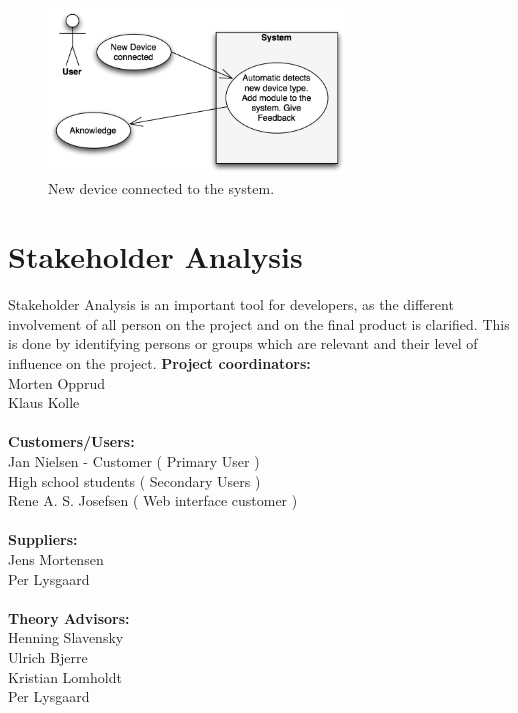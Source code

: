\begin{figure}[H]
	\begin{centering}
		\includegraphics[width=0.7\textwidth]{images/usecases2.jpg}
		\caption{New device connected to the system. }
	\end{centering}
\end{figure}

\section{Stakeholder Analysis}

Stakeholder Analysis is an important tool for developers, as the different involvement of all person on the project and on the final product is clarified. This is done by identifying persons or groups which are relevant and their level of influence on the project.
\p
\textbf{Project coordinators:}\\ Morten Opprud\\ Klaus Kolle\\
\\
\textbf{Customers/Users:}\\
Jan Nielsen - Customer ( Primary User )\\
High school students ( Secondary Users )\\
Rene A. S. Josefsen ( Web interface customer )\\
\\
\textbf{Suppliers:}\\
Jens Mortensen\\
Per Lysgaard\\
\\
\textbf{Theory Advisors:}\\
Henning Slavensky\\
Ulrich Bjerre\\
Kristian Lomholdt\\
Per Lysgaard\\

